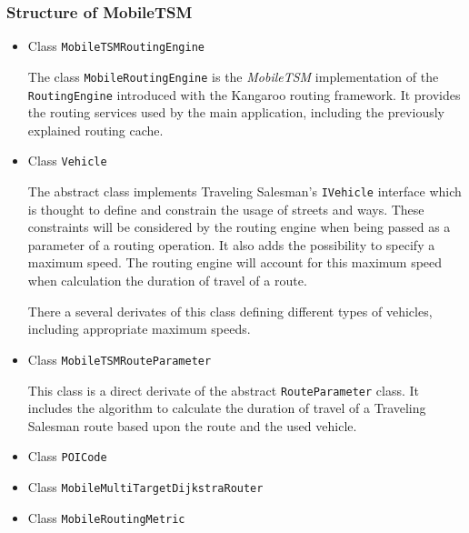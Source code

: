 \subsubsection{Structure of MobileTSM}

\begin{itemize}
		
	\item Class \texttt{MobileTSMRoutingEngine}
	
		The class \texttt{MobileRoutingEngine} is the \emph{MobileTSM} implementation of the \texttt{RoutingEngine} introduced with the Kangaroo routing framework. It provides the routing services used by the main application, including the previously explained routing cache.
		
	\item Class \texttt{Vehicle}
	
		The abstract class  implements Traveling Salesman's \texttt{IVehicle} interface which is thought to define and constrain the usage of streets and ways. These constraints will be considered by the routing engine when being passed as a parameter of a routing operation. It also adds the possibility to specify a maximum speed. The routing engine will account for this maximum speed when calculation the duration of travel of a route.\newline
		
		There a several derivates of this class defining different types of vehicles, including appropriate maximum speeds.
	
	\item Class \texttt{MobileTSMRouteParameter}
	
		This class is a direct derivate of the abstract \texttt{RouteParameter} class. It includes the algorithm to calculate the duration of travel of a Traveling Salesman route based upon the route and the used vehicle.

	\item Class \texttt{POICode}

	\item Class \texttt{MobileMultiTargetDijkstraRouter}
	
	\item Class \texttt{MobileRoutingMetric}

\end{itemize}



